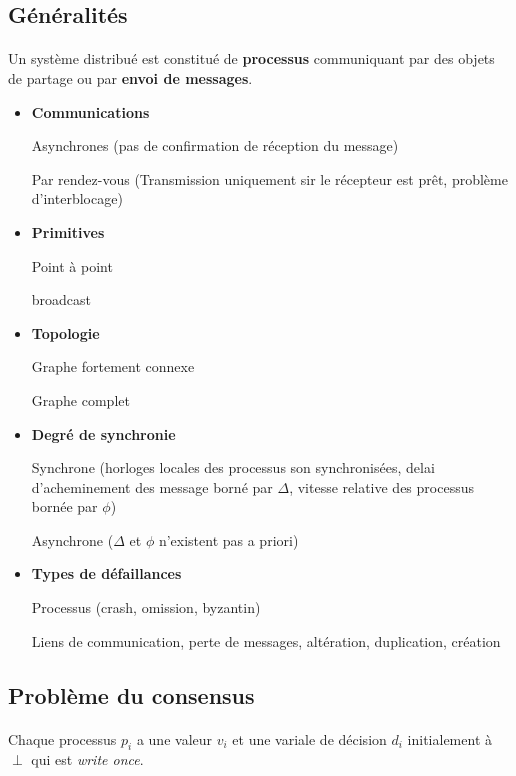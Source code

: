 \documentclass[french]{article}
\begin{document}
\subsection{Généralités}

\paragraph{}Un système distribué est constitué de \textbf{processus} communiquant par des objets de partage ou par \textbf{envoi de messages}.\\

\begin{itemize}
	\item \textbf{Communications}
	
	Asynchrones (pas de confirmation de réception du message)
	
	Par rendez-vous (Transmission uniquement sir le récepteur est prêt, problème d'interblocage)
	
	\item \textbf{Primitives} 
	
	Point à point
	
	broadcast
	
	\item \textbf{Topologie}
	
	Graphe fortement connexe
	
	Graphe complet
	
	\item \textbf{Degré de synchronie}
	
	Synchrone (horloges locales des processus son synchronisées, delai d'acheminement des message borné par $\Delta$, vitesse relative des processus bornée par $\phi$)
	
	Asynchrone ($\Delta$ et $\phi$ n'existent pas a priori)
	
	\item \textbf{Types de défaillances}
	
	Processus (crash, omission, byzantin)
	
	Liens de communication, perte de messages, altération, duplication, création
\end{itemize}

\subsection{Problème du consensus}

\paragraph{}Chaque processus $p_i$ a une valeur $v_i$ et une variale de décision $d_i$ initialement à $\perp$ qui est \emph{write once}.
\end{document}
